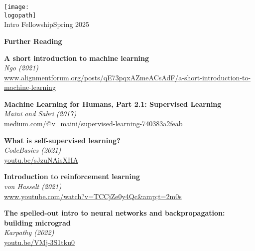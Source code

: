 \documentclass[12pt]{article}
\def\logopath{../assets/caiac_logo.png}  %
\begin{document}
\thispagestyle{empty} %

\begin{center}
    \texttt{[image: \\logopath]}\\
    \vspace{0.2em}
    {\color{primaryFaded}Intro Fellowship\color{primaryFaded}Spring 2025}
\end{center}

\vspace{1em}

\begin{center}
    {\LARGE \textbf{Further Reading}}
\end{center}

\vspace{1em}

\noindent\textbf{A short introduction to machine learning}\\
\textit{Ngo (2021)}\\
{\small \url{www.alignmentforum.org/posts/qE73pqxAZmeACsAdF/a-short-introduction-to-machine-learning}}

\vspace{1em}
\noindent\textbf{Machine Learning for Humans, Part 2.1: Supervised Learning}\\
\textit{Maini and Sabri (2017)}\\
{\small \url{medium.com/@v_maini/supervised-learning-740383a2feab}}

\vspace{1em}
\noindent\textbf{What is self-supervised learning?}\\
\textit{CodeBasics (2021)}\\
{\small \url{youtu.be/sJzuNAisXHA}}

\vspace{1em}
\noindent\textbf{Introduction to reinforcement learning}\\
\textit{von Hasselt (2021)}\\
{\small \url{www.youtube.com/watch?v=TCCjZe0y4Qc&amp;t=2m0s}}

\vspace{1em}
\noindent\textbf{The spelled-out intro to neural networks and backpropagation: building micrograd}\\
\textit{Karpathy (2022)}\\
{\small \url{youtu.be/VMj-3S1tku0}}
\end{document}
